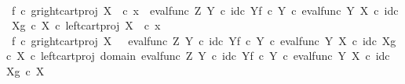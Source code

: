 \begin{isabellebody}
\ \ \ \ \isamarkupfalse%
\ \isamarkupfalse%
\ {\isachardoublequoteopen}{\isacharparenleft}{\kern0pt}f\isactrlsup {\isasymflat}\ {\isasymcirc}\isactrlsub c\ {\isasymlangle}g\isactrlsup {\isasymflat}{\isacharcomma}{\kern0pt}right{\isacharunderscore}{\kern0pt}cart{\isacharunderscore}{\kern0pt}proj\ X\ {\isasymone}{\isasymrangle}{\isacharparenright}{\kern0pt}\ {\isasymcirc}\isactrlsub c\ x{}\ {\isacharequal}{\kern0pt}\ {\isacharparenleft}{\kern0pt}{\isacharparenleft}{\kern0pt}{\isacharparenleft}{\kern0pt}eval{\isacharunderscore}{\kern0pt}func\ Z\ Y\ {\isasymcirc}\isactrlsub c\ {\isasymlangle}id\isactrlsub c\ Y{\isacharcomma}{\kern0pt}f\ {\isasymcirc}\isactrlsub c\ {\isasymbeta}\isactrlbsub Y\isactrlesub {\isasymrangle}{\isacharparenright}{\kern0pt}\ {\isasymcirc}\isactrlsub c\ eval{\isacharunderscore}{\kern0pt}func\ Y\ X\ {\isasymcirc}\isactrlsub c\ {\isasymlangle}id\isactrlsub c\ X{\isacharcomma}{\kern0pt}g\ {\isasymcirc}\isactrlsub c\ {\isasymbeta}\isactrlbsub X\isactrlesub {\isasymrangle}{\isacharparenright}{\kern0pt}\ {\isasymcirc}\isactrlsub c\ left{\isacharunderscore}{\kern0pt}cart{\isacharunderscore}{\kern0pt}proj\ X\ {\isasymone}{\isacharparenright}{\kern0pt}\ {\isasymcirc}\isactrlsub c\ x{}{\isachardoublequoteclose}\isacommand{{\isachardot}{\kern0pt}}\isamarkupfalse%
\ \ \ \ \ \ \isanewline
\ \ \isamarkupfalse%
\isanewline
\ \ \isamarkupfalse%
\ \isamarkupfalse%
\ {\isachardoublequoteopen}{\isacharparenleft}{\kern0pt}f\isactrlsup {\isasymflat}\ {\isasymcirc}\isactrlsub c\ {\isasymlangle}g\isactrlsup {\isasymflat}{\isacharcomma}{\kern0pt}right{\isacharunderscore}{\kern0pt}cart{\isacharunderscore}{\kern0pt}proj\ X\ {\isasymone}{\isasymrangle}{\isacharparenright}{\kern0pt}\isactrlsup {\isasymsharp}\ {\isacharequal}{\kern0pt}\ {\isacharparenleft}{\kern0pt}{\isacharparenleft}{\kern0pt}{\isacharparenleft}{\kern0pt}eval{\isacharunderscore}{\kern0pt}func\ Z\ Y\ {\isasymcirc}\isactrlsub c\ {\isasymlangle}id\isactrlsub c\ Y{\isacharcomma}{\kern0pt}f\ {\isasymcirc}\isactrlsub c\ {\isasymbeta}\isactrlbsub Y\isactrlesub {\isasymrangle}{\isacharparenright}{\kern0pt}\ {\isasymcirc}\isactrlsub c\ eval{\isacharunderscore}{\kern0pt}func\ Y\ X\ {\isasymcirc}\isactrlsub c\ {\isasymlangle}id\isactrlsub c\ X{\isacharcomma}{\kern0pt}g\ {\isasymcirc}\isactrlsub c\ {\isasymbeta}\isactrlbsub X\isactrlesub {\isasymrangle}{\isacharparenright}{\kern0pt}\ {\isasymcirc}\isactrlsub c\ left{\isacharunderscore}{\kern0pt}cart{\isacharunderscore}{\kern0pt}proj\ {\isacharparenleft}{\kern0pt}domain\ {\isacharparenleft}{\kern0pt}{\isacharparenleft}{\kern0pt}eval{\isacharunderscore}{\kern0pt}func\ Z\ Y\ {\isasymcirc}\isactrlsub c\ {\isasymlangle}id\isactrlsub c\ Y{\isacharcomma}{\kern0pt}f\ {\isasymcirc}\isactrlsub c\ {\isasymbeta}\isactrlbsub Y\isactrlesub {\isasymrangle}{\isacharparenright}{\kern0pt}\ {\isasymcirc}\isactrlsub c\ eval{\isacharunderscore}{\kern0pt}func\ Y\ X\ {\isasymcirc}\isactrlsub c\ {\isasymlangle}id\isactrlsub c\ X{\isacharcomma}{\kern0pt}g\ {\isasymcirc}\isactrlsub c\ {\isasymbeta}\isactrlbsub X\isactrlesub {\isasymrangle}{\isacharparenright}{\kern0pt}{\isacharparenright}{\kern0pt}\ {\isasymone}{\isacharparenright}{\kern0pt}\isactrlsup {\isasymsharp}{\isachardoublequoteclose}\isanewline

\end{isabellebody}
